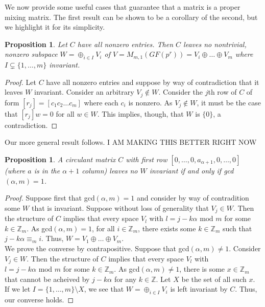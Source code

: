 \documentclass[11pt]{amsart}
\newtheorem{proposition}[theorem]{{\bf Proposition}}
\begin{document}
We now provide some useful cases that guarantee that a matrix is a proper mixing matrix. The first result can be shown to be a corollary of the second, but we highlight it for its simplicity.

\begin{proposition}
Let $C$ have all nonzero entries. Then $C$ leaves no nontrivial, nonzero subspace $W = \oplus_{i \in I} V_i$ of $V = M_{m,1}(GF(p^r))=V_i \oplus \dots \oplus V_m$ where $I \subsetneq \{1,\dots,m\}$ invariant.
\end{proposition}
\begin{proof}
Let $C$ have all nonzero entries and suppose by way of contradiction that it leaves $W$ invariant. Consider an arbitrary $V_j \not\in W$. Consider the $j$th row of $C$ of form $[r_j] = [c_1 c_2 \dots c_m]$ where each $c_i$ is nonzero. As $V_j \not\in W$, it must be the case that $[r_j]w = 0$ for all $w \in W$. This implies, though, that $W$ is $\{0\}$, a contradiction.
\end{proof}

Our more general result follows. I AM MAKING THIS BETTER RIGHT NOW

\begin{proposition}
A circulant matrix $C$ with first row $[0,\dots,0,a_{\alpha + 1}, 0, \dots, 0]$ (where $a$ is in the $\alpha + 1$ column) leaves no $W$ invariant if and only if gcd$(\alpha,m)=1$.
\end{proposition}
\begin{proof}
Suppose first that gcd$(\alpha,m) = 1$ and consider by way of contradition some $W$ that is invariant. Suppose without loss of generality that $V_j \in W$. Then the structure of $C$ implies that every space $V_{l}$ with $l = j - k \alpha \text{ mod } m$ for some $k \in \mathbb{Z}_m$. As gcd$(\alpha,m)=1$, for all $i \in \mathbb{Z}_m$, there exists some $k \in \mathbb{Z}_m$ such that $j - k\alpha \equiv_m i$. Thus, $W = V_1 \oplus \dots \oplus V_m$. \\

We prove the converse by contrapositive. Suppose that gcd$(\alpha,m) \neq 1$. Consider $V_j \in W$. Then the structure of $C$ implies that every space $V_{l}$ with $l = j - k \alpha \text{ mod } m$ for some $k \in \mathbb{Z}_m$. As gcd$(\alpha,m) \neq 1$, there is some $x \in \mathbb{Z}_m$ that cannot be acheived by $j - k\alpha$ for any $k \in \mathbb{Z}$. Let $X$ be the set of all such $x$. If we let $I = \{1,\dots,m\} \setminus X$, we see that $W = \oplus_{i \in I} V_i$ is left invariant by $C$. Thus, our converse holds.
\end{proof}
\end{document}
